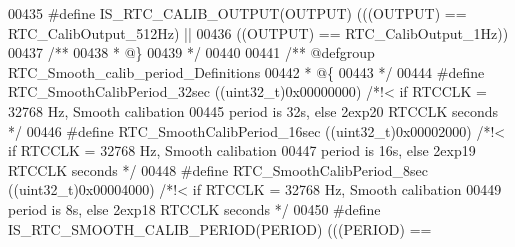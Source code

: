 \begin{DoxyCode}
00435 \textcolor{preprocessor}{#}\textcolor{preprocessor}{define} \textcolor{preprocessor}{IS\_RTC\_CALIB\_OUTPUT}\textcolor{preprocessor}{(}\textcolor{preprocessor}{OUTPUT}\textcolor{preprocessor}{)}  \textcolor{preprocessor}{(}\textcolor{preprocessor}{(}\textcolor{preprocessor}{(}\textcolor{preprocessor}{OUTPUT}\textcolor{preprocessor}{)} \textcolor{preprocessor}{==} RTC_CalibOutput_512Hz\textcolor{preprocessor}{)} \textcolor{preprocessor}{||}
00436                                       \textcolor{preprocessor}{(}\textcolor{preprocessor}{(}\textcolor{preprocessor}{OUTPUT}\textcolor{preprocessor}{)} \textcolor{preprocessor}{==} RTC_CalibOutput_1Hz\textcolor{preprocessor}{)}\textcolor{preprocessor}{)}
00437 \textcolor{comment}{/**}
00438 \textcolor{comment}{  * @\}}
00439 \textcolor{comment}{  */}
00440 
00441 \textcolor{comment}{/** @defgroup RTC\_Smooth\_calib\_period\_Definitions }
00442 \textcolor{comment}{  * @\{}
00443 \textcolor{comment}{  */}
00444 \textcolor{preprocessor}{#}\textcolor{preprocessor}{define} \textcolor{preprocessor}{RTC\_SmoothCalibPeriod\_32sec}   \textcolor{preprocessor}{(}\textcolor{preprocessor}{(}\textcolor{preprocessor}{uint32\_t}\textcolor{preprocessor}{)}0x00000000\textcolor{preprocessor}{)} \textcolor{comment}{/*!<  if RTCCLK = 32768 Hz, Smooth
       calibation}
00445 \textcolor{comment}{                                                             period is 32s,  else 2exp20 RTCCLK
       seconds */}
00446 \textcolor{preprocessor}{#}\textcolor{preprocessor}{define} \textcolor{preprocessor}{RTC\_SmoothCalibPeriod\_16sec}   \textcolor{preprocessor}{(}\textcolor{preprocessor}{(}\textcolor{preprocessor}{uint32\_t}\textcolor{preprocessor}{)}0x00002000\textcolor{preprocessor}{)} \textcolor{comment}{/*!<  if RTCCLK = 32768 Hz, Smooth
       calibation }
00447 \textcolor{comment}{                                                             period is 16s, else 2exp19 RTCCLK seconds
       */}
00448 \textcolor{preprocessor}{#}\textcolor{preprocessor}{define} \textcolor{preprocessor}{RTC\_SmoothCalibPeriod\_8sec}    \textcolor{preprocessor}{(}\textcolor{preprocessor}{(}\textcolor{preprocessor}{uint32\_t}\textcolor{preprocessor}{)}0x00004000\textcolor{preprocessor}{)} \textcolor{comment}{/*!<  if RTCCLK = 32768 Hz, Smooth
       calibation }
00449 \textcolor{comment}{                                                             period is 8s, else 2exp18 RTCCLK seconds
       */}
00450 \textcolor{preprocessor}{#}\textcolor{preprocessor}{define} \textcolor{preprocessor}{IS\_RTC\_SMOOTH\_CALIB\_PERIOD}\textcolor{preprocessor}{(}\textcolor{preprocessor}{PERIOD}\textcolor{preprocessor}{)} \textcolor{preprocessor}{(}\textcolor{preprocessor}{(}\textcolor{preprocessor}{(}\textcolor{preprocessor}{PERIOD}\textcolor{preprocessor}{)} \textcolor{preprocessor}{==} 

\end{DoxyCode}

